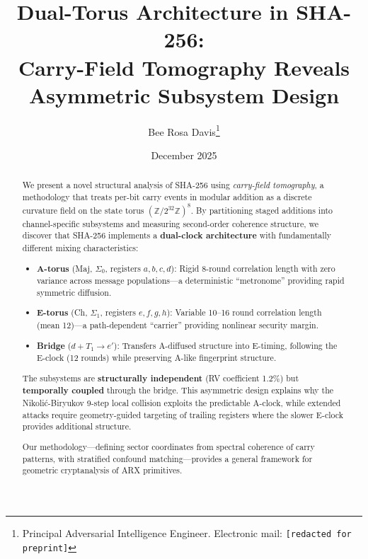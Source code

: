 \documentclass[11pt,a4paper]{article}
\theoremstyle{plain}
\theoremstyle{definition}
\theoremstyle{remark}
\newcommand{\Z}{\mathbb{Z}}
\begin{document}
\title{Dual-Torus Architecture in SHA-256:\\
Carry-Field Tomography Reveals Asymmetric Subsystem Design}

\author{Bee Rosa Davis\thanks{Principal Adversarial Intelligence Engineer. Electronic mail: \texttt{[redacted for preprint]}}}

\date{December 2025}

\maketitle

\begin{abstract}
We present a novel structural analysis of SHA-256 using \emph{carry-field tomography}, a methodology that treats per-bit carry events in modular addition as a discrete curvature field on the state torus $(\Z/2^{32}\Z)^8$. By partitioning staged additions into channel-specific subsystems and measuring second-order coherence structure, we discover that SHA-256 implements a \textbf{dual-clock architecture} with fundamentally different mixing characteristics:

\begin{itemize}[nosep]
    \item \textbf{A-torus} (Maj, $\Sigma_0$, registers $a,b,c,d$): Rigid 8-round correlation length with zero variance across message populations---a deterministic ``metronome'' providing rapid symmetric diffusion.
    \item \textbf{E-torus} (Ch, $\Sigma_1$, registers $e,f,g,h$): Variable 10--16 round correlation length (mean 12)---a path-dependent ``carrier'' providing nonlinear security margin.
    \item \textbf{Bridge} ($d + T_1 \to e'$): Transfers A-diffused structure into E-timing, following the E-clock (12 rounds) while preserving A-like fingerprint structure.
\end{itemize}

The subsystems are \textbf{structurally independent} (RV coefficient 1.2\%) but \textbf{temporally coupled} through the bridge. This asymmetric design explains why the Nikoli\'{c}-Biryukov 9-step local collision exploits the predictable A-clock, while extended attacks require geometry-guided targeting of trailing registers where the slower E-clock provides additional structure.

Our methodology---defining sector coordinates from spectral coherence of carry patterns, with stratified confound matching---provides a general framework for geometric cryptanalysis of ARX primitives.
\end{abstract}
\end{document}
